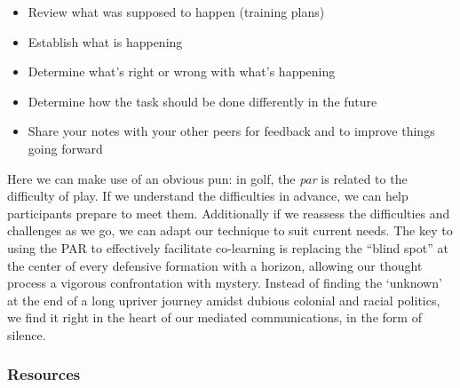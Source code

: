\begin{itemize}
\item
  Review what was supposed to happen (training plans)
\item
  Establish what is happening
\item
  Determine what's right or wrong with what's happening
\item
  Determine how the task should be done differently in the future
\item
  Share your notes with your other peers for feedback and to improve
  things going forward
\end{itemize}
Here we can make use of an obvious pun: in golf, the \emph{par} is
related to the difficulty of play. If we understand the difficulties in
advance, we can help participants prepare to meet them. Additionally if
we reassess the difficulties and challenges as we go, we can adapt our
technique to suit current needs. The key to using the PAR to effectively
facilitate co-learning is replacing the ``blind spot'' at the center of
every defensive formation with a horizon, allowing our thought process a
vigorous confrontation with mystery. Instead of finding the `unknown' at
the end of a long upriver journey amidst dubious colonial and racial
politics, we find it right in the heart of our mediated communications,
in the form of silence.

\subsubsection{Resources}

